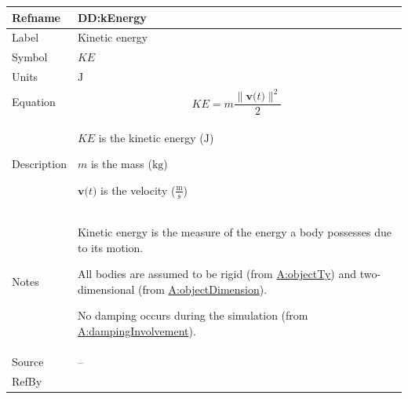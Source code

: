 \documentclass[12pt]{article}
\begin{document}
\vspace{\baselineskip}
\noindent
\begin{minipage}{\textwidth}
\begin{tabular}{>{\raggedright}p{}>{\raggedright\arraybackslash}p{}}
\toprule \textbf{Refname} & \textbf{DD:kEnergy}
\label{DD:kEnergy}
\\ \midrule
Label & Kinetic energy
        
\\ \midrule
Symbol & $KE$
         
\\ \midrule
Units & ${\text{J}}$
        
\\ \midrule
Equation & \begin{displaymath}
           KE=m \frac{\|\symbf{v}\text{(}t\text{)}\|^{2}}{2}
           \end{displaymath}
\\ \midrule
Description & \begin{symbDescription}
              \item{$KE$ is the kinetic energy (${\text{J}}$)}
              \item{$m$ is the mass (${\text{kg}}$)}
              \item{$\symbf{v}\text{(}t\text{)}$ is the velocity ($\frac{\text{m}}{\text{s}}$)}
              \end{symbDescription}
\\ \midrule
Notes & Kinetic energy is the measure of the energy a body possesses due to its motion.
        
        All bodies are assumed to be rigid (from \hyperref[assumpOT]{A:objectTy}) and two-dimensional (from \hyperref[assumpOD]{A:objectDimension}).
        
        No damping occurs during the simulation (from \hyperref[assumpDI]{A:dampingInvolvement}).
        
\\ \midrule
Source & --
         
\\ \midrule
RefBy & 
\\ \bottomrule
\end{tabular}
\end{minipage}
\end{document}
